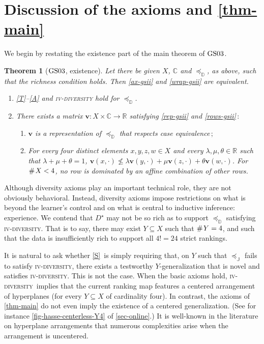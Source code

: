 \documentclass[ecta,nameyear,draft]{econsocart}
\newcommand{\countof}{\mathbin{\#}\hskip1pt}
\newcommand{\R}{\mathbb R}
\newcommand{\preceqb}{\mathbin{\preceq}}
\newcommand{\mbbd}{{\mathds D}}
\newcommand{\mbbc}{{\mathds C}}
\newcommand{\mbbj}{\mathds J}
\newcommand{\past}{{D^\star}}
\newcommand{\stability}{\ref{S}}
\newcommand{\fourdiv}{\textsc{iv}-\textsc{diversity}}
\newcommand{\gsii}{$\textup{GS03}$}
\theoremstyle{plain}
\newtheorem*{theorem*}{Theorem}
\theoremstyle{remark}
\begin{document}
\section{Discussion of the axioms and \cref{thm-main}}\label{sec-discussion}
We begin by restating the existence part of the main theorem of \gsii.
\begin{theorem*}[\gsii, existence]\label{thm-gsii} Let there be given $X$,
  $\mbbc$ and $\preceqb_ \mbbd$, as above, such that the richness condition
  holds. Then \ref{ax-gsii} and \ref{wrap-gsii} are equivalent.
  \begin{enumerate}[label=\textup{(\roman*)}]
    \item\label{ax-gsii} \textup{\ref{T}--\ref{A}} and \textup{\fourdiv} hold
      for $\preceq_{\mbbd}$.
    \item\label{wrap-gsii} There exists a matrix $\mathbf{v} : X \times \mbbc
      \rightarrow \R$ satisfying \ref{rep-gsii} and \ref{rows-gsii}$\,:$
      \begin{enumerate}[label=\textup{(\alph*)}]
        \item\label{rep-gsii} $\mathbf{v}$ is a representation of
          $\preceq_{\mbbd}$ that respects case equivalence$\,;$
        \item\label{rows-gsii} For every four distinct elements $x,y,z,w \in X$
          and every $\lambda , \mu, \theta \in \R$ such that $\lambda +\mu +
          \theta = 1$, $\mathbf{v}(x,\cdot ) \not \leq \lambda
          \mathbf{v}(y,\cdot
          )+\mu
          \mathbf{v}(z,\cdot)+ \theta \mathbf{v}(w,\cdot)$.  For $\countof X <
          4$, no row is dominated by an affine combination of other rows.
      \end{enumerate} 
  \end{enumerate}
\end{theorem*}

Although diversity axioms play an important technical role, they are not
obviously behavioral. Instead, diversity axioms impose restrictions on what is
beyond the learner's control and on what is central to inductive inference:
experience. We contend that $\past$ may not be so rich as to support
$\preceqb_{\mbbd}$ satisfying \fourdiv. That is to say, there may exist $Y
\subseteq X$ such that $\countof Y = 4$, and such that the data is
insufficiently rich to support all $4 ! = 24$ strict rankings.

It is natural to ask whether \stability\ is simply requiring that, on $Y$ such
that $\preceq_{\mbbj}$ fails to satisfy \fourdiv, there exists a testworthy
$Y$-generalization that is novel and satisfies \fourdiv.  This is not the
case.  When the basic axioms hold, \fourdiv\ implies that the current ranking
map features a centered arrangement of hyperplanes (for every $Y\subseteq X$ of
cardinality four). In contrast, the axioms of \cref{thm-main} do not even imply
the existence of a centered generalization.  (See for instance
\cref{fig-hasse-centerless-Y4} of \cref{sec-online}.) It is well-known in the
literature on hyperplane arrangements that numerous complexities arise when the
arrangement is uncentered.
\end{document}
